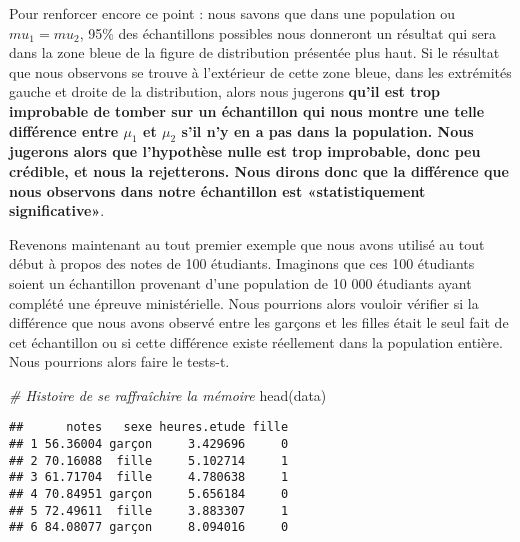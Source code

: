 \documentclass[
]{book}
\newenvironment{Shaded}{\begin{snugshade}}{\end{snugshade}}
\newcommand{\CommentTok}[1]{\textcolor[rgb]{0.56,0.35,0.01}{\textit{#1}}}
\newcommand{\FunctionTok}[1]{\textcolor[rgb]{0.00,0.00,0.00}{#1}}
\newcommand{\NormalTok}[1]{#1}
\newcommand{\SpecialCharTok}[1]{\textcolor[rgb]{0.00,0.00,0.00}{#1}}
\begin{document}
Pour renforcer encore ce point : nous savons que dans une population ou \(mu_1=mu_2\), 95\% des échantillons possibles nous donneront un résultat qui sera dans la zone bleue de la figure de distribution présentée plus haut. Si le résultat que nous observons se trouve à l'extérieur de cette zone bleue, dans les extrémités gauche et droite de la distribution, alors nous jugerons \textbf{qu'il est trop improbable de tomber sur un échantillon qui nous montre une telle différence entre \(\mu_1\) et \(\mu_2\) s'il n'y en a pas dans la population. Nous jugerons alors que l'hypothèse nulle est trop improbable, donc peu crédible, et nous la rejetterons. Nous dirons donc que la différence que nous observons dans notre échantillon est «statistiquement significative»}.

Revenons maintenant au tout premier exemple que nous avons utilisé au tout début à propos des notes de 100 étudiants. Imaginons que ces 100 étudiants soient un échantillon provenant d'une population de 10 000 étudiants ayant complété une épreuve ministérielle. Nous pourrions alors vouloir vérifier si la différence que nous avons observé entre les garçons et les filles était le seul fait de cet échantillon ou si cette différence existe réellement dans la population entière. Nous pourrions alors faire le tests-t.

\begin{Shaded}
\begin{Highlighting}[]
\CommentTok{\# Histoire de se raffraîchire la mémoire}
\FunctionTok{head}\NormalTok{(data)}
\end{Highlighting}
\end{Shaded}

\begin{verbatim}
##      notes   sexe heures.etude fille
## 1 56.36004 garçon     3.429696     0
## 2 70.16088  fille     5.102714     1
## 3 61.71704  fille     4.780638     1
## 4 70.84951 garçon     5.656184     0
## 5 72.49611  fille     3.883307     1
## 6 84.08077 garçon     8.094016     0
\end{verbatim}

\begin{Shaded}
\end{Shaded}
\end{document}

